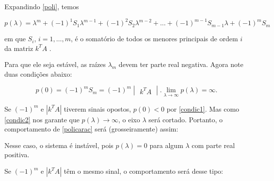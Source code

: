 \documentclass[
	12pt,				%
	openright,			%
	twoside,			%
	a4paper,			%
	english,			%
	french,				%
	spanish,			%
	brazil				%
	]{abntex2}
\begin{document}
Expandindo \ref{poli}, temos

\begin{equation} \label{policarac}
	p(\lambda) = \lambda^m + (-1)^1 S_1 \lambda^{m-1} + (-1)^2 S_2 \lambda^{m-2} + \ldots +
	(-1)^{m-1} S_{m-1} \lambda + (-1)^m S_m
\end{equation}

em que $S_i$, $i = 1, \ldots, m$, é o somatório de todos os menores principais
de ordem $i$ da matriz $k^T A$ .

Para que ele seja estável, as raízes $\lambda_m$ devem ter parte real negativa.
Agora note duas condições abaixo:

\begin{subequations}
\begin{equation} \label{condic1}
	p(0) = (-1)^m S_m = (-1)^m
	\begin{vmatrix}
		k^T A
	\end{vmatrix}.
\end{equation}

\begin{equation} \label{condic2}
	\lim_{\lambda \to \infty} p(\lambda) = \infty.
\end{equation}
\end{subequations}

Se  $(-1)^m$ e $|k^T A|$ tiverem sinais opostos, $p(0) < 0$ por \ref{condic1}.
Mas como \ref{condic2} nos garante que $p(\lambda) \to \infty$, o eixo $\lambda$
será cortado. Portanto, o comportamento de \ref{policarac} será (grosseiramente)
assim:

\newpage

\begin{center}
\end{center}

Nesse caso, o sistema é instável, pois $p(\lambda) = 0$ para algum $\lambda$ com parte
real positiva.

Se $(-1)^m$ e $|k^T A|$ têm o mesmo sinal, o comportamento será desse tipo:

\begin{center}
\end{center}
\end{document}
